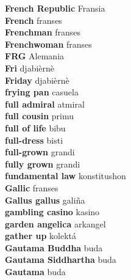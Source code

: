 \textbf{ French Republic  } Fransia \\
\textbf{ French  } franses \\
\textbf{ Frenchman  } franses \\
\textbf{ Frenchwoman  } franses \\
\textbf{ FRG  } Alemania \\
\textbf{ Fri  } djabièrnè \\
\textbf{ Friday  } djabièrnè \\
\textbf{ frying pan  } casuela \\
\textbf{ full admiral  } atmiral \\
\textbf{ full cousin  } primu \\
\textbf{ full of life  } bibu \\
\textbf{ full-dress  } bisti \\
\textbf{ full-grown  } grandi \\
\textbf{ fully grown  } grandi \\
\textbf{ fundamental law  } konstitushon \\
\textbf{ Gallic  } franses \\
\textbf{ Gallus gallus  } galiña \\
\textbf{ gambling casino  } kasino \\
\textbf{ garden angelica  } arkangel \\
\textbf{ gather up  } kolektá \\
\textbf{ Gautama Buddha  } buda \\
\textbf{ Gautama Siddhartha  } buda \\
\textbf{ Gautama  } buda \\
